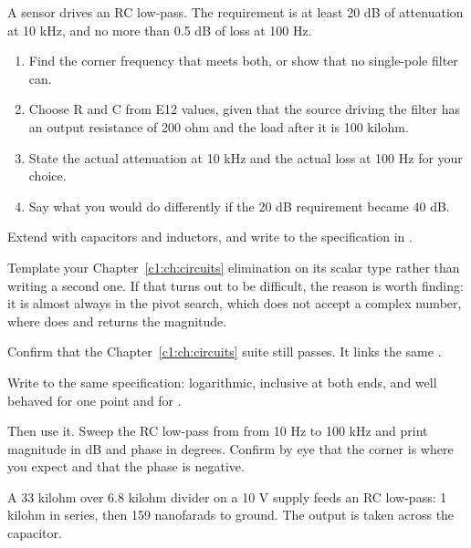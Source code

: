 \label{c2:ex:5}
A sensor drives an RC low-pass. The requirement is at least 20 dB of attenuation at 10 kHz, and no more than 0.5 dB of loss at 100 Hz.

\begin{enumerate}
  \item Find the corner frequency that meets both, or show that no single-pole filter can.
  \item Choose R and C from E12 values, given that the source driving the filter has an output resistance of 200 ohm and the load after it is 100 kilohm.
  \item State the actual attenuation at 10 kHz and the actual loss at 100 Hz for your choice.
  \item Say what you would do differently if the 20 dB requirement became 40 dB.
\end{enumerate}

\label{c2:ex:6}
Extend  with capacitors and inductors, and write  to the specification in .

Template your Chapter~\ref{c1:ch:circuits} elimination on its scalar type rather than writing a second one. If that turns out to be difficult, the reason is worth finding: it is almost always  in the pivot search, which does not accept a complex number, where  does and returns the magnitude.

Confirm that the Chapter~\ref{c1:ch:circuits} suite still passes. It links the same .

\label{c2:ex:7}
Write  to the same specification: logarithmic, inclusive at both ends, and well behaved for one point and for .

Then use it. Sweep the RC low-pass from  from 10 Hz to 100 kHz and print magnitude in dB and phase in degrees. Confirm by eye that the corner is where you expect and that the phase is negative.

\label{c2:ex:8}
A 33 kilohm over 6.8 kilohm divider on a 10 V supply feeds an RC low-pass: 1 kilohm in series, then 159 nanofarads to ground. The output is taken across the capacitor.

